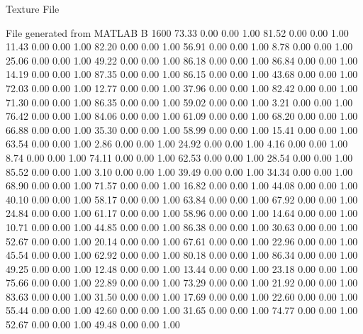 Texture File

File generated from MATLAB
B 1600
   73.33   0.00   0.00   1.00
   81.52   0.00   0.00   1.00
   11.43   0.00   0.00   1.00
   82.20   0.00   0.00   1.00
   56.91   0.00   0.00   1.00
    8.78   0.00   0.00   1.00
   25.06   0.00   0.00   1.00
   49.22   0.00   0.00   1.00
   86.18   0.00   0.00   1.00
   86.84   0.00   0.00   1.00
   14.19   0.00   0.00   1.00
   87.35   0.00   0.00   1.00
   86.15   0.00   0.00   1.00
   43.68   0.00   0.00   1.00
   72.03   0.00   0.00   1.00
   12.77   0.00   0.00   1.00
   37.96   0.00   0.00   1.00
   82.42   0.00   0.00   1.00
   71.30   0.00   0.00   1.00
   86.35   0.00   0.00   1.00
   59.02   0.00   0.00   1.00
    3.21   0.00   0.00   1.00
   76.42   0.00   0.00   1.00
   84.06   0.00   0.00   1.00
   61.09   0.00   0.00   1.00
   68.20   0.00   0.00   1.00
   66.88   0.00   0.00   1.00
   35.30   0.00   0.00   1.00
   58.99   0.00   0.00   1.00
   15.41   0.00   0.00   1.00
   63.54   0.00   0.00   1.00
    2.86   0.00   0.00   1.00
   24.92   0.00   0.00   1.00
    4.16   0.00   0.00   1.00
    8.74   0.00   0.00   1.00
   74.11   0.00   0.00   1.00
   62.53   0.00   0.00   1.00
   28.54   0.00   0.00   1.00
   85.52   0.00   0.00   1.00
    3.10   0.00   0.00   1.00
   39.49   0.00   0.00   1.00
   34.34   0.00   0.00   1.00
   68.90   0.00   0.00   1.00
   71.57   0.00   0.00   1.00
   16.82   0.00   0.00   1.00
   44.08   0.00   0.00   1.00
   40.10   0.00   0.00   1.00
   58.17   0.00   0.00   1.00
   63.84   0.00   0.00   1.00
   67.92   0.00   0.00   1.00
   24.84   0.00   0.00   1.00
   61.17   0.00   0.00   1.00
   58.96   0.00   0.00   1.00
   14.64   0.00   0.00   1.00
   10.71   0.00   0.00   1.00
   44.85   0.00   0.00   1.00
   86.38   0.00   0.00   1.00
   30.63   0.00   0.00   1.00
   52.67   0.00   0.00   1.00
   20.14   0.00   0.00   1.00
   67.61   0.00   0.00   1.00
   22.96   0.00   0.00   1.00
   45.54   0.00   0.00   1.00
   62.92   0.00   0.00   1.00
   80.18   0.00   0.00   1.00
   86.34   0.00   0.00   1.00
   49.25   0.00   0.00   1.00
   12.48   0.00   0.00   1.00
   13.44   0.00   0.00   1.00
   23.18   0.00   0.00   1.00
   75.66   0.00   0.00   1.00
   22.89   0.00   0.00   1.00
   73.29   0.00   0.00   1.00
   21.92   0.00   0.00   1.00
   83.63   0.00   0.00   1.00
   31.50   0.00   0.00   1.00
   17.69   0.00   0.00   1.00
   22.60   0.00   0.00   1.00
   55.44   0.00   0.00   1.00
   42.60   0.00   0.00   1.00
   31.65   0.00   0.00   1.00
   74.77   0.00   0.00   1.00
   52.67   0.00   0.00   1.00
   49.48   0.00   0.00   1.00
